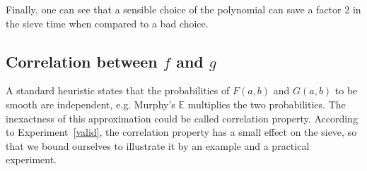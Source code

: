 \documentclass[a4wide]{article}
\theoremstyle{plain}
\theoremstyle{definition}
\theoremstyle{remark}
\begin{document}
Finally, one can see that a sensible choice of the polynomial can save a
factor $2$ in the sieve time when compared to a bad choice. 


\subsection{Correlation between $f$ and $g$}
\label{sec:correlation}
A standard heuristic states that the probabilities of $F(a,b)$ and $G(a,b)$
to be smooth are independent, e.g. Murphy's $\mathbb{E}$ multiplies the two
probabilities. The inexactness of this approximation could be called
correlation property. According to Experiment~\ref{valid}, the correlation property
has a small effect on the sieve, so that we bound ourselves to illustrate it
by an example and a practical experiment. 
\end{document}
